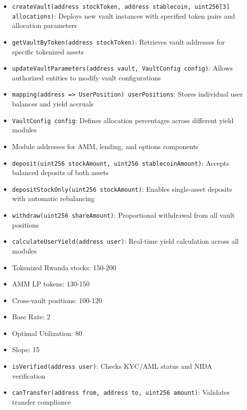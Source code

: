 \documentclass[12pt]{article}
\begin{document}
{{{\begin{itemize}
\subsubsection{3.2 Core Architecture Overview} %
	\item \lstinline{createVault(address stockToken, address stablecoin, uint256[3] allocations)}: Deploys new vault instances with specified token pairs and allocation parameters
	\item \lstinline{getVaultByToken(address stockToken)}: Retrieves vault addresses for specific tokenized assets
	\item \lstinline{updateVaultParameters(address vault, VaultConfig config)}: Allows authorized entities to modify vault configurations
	\item \lstinline{mapping(address => UserPosition) userPositions}: Stores individual user balances and yield accruals
	\item \lstinline{VaultConfig config}: Defines allocation percentages across different yield modules
	\item Module addresses for AMM, lending, and options components
	\item \lstinline{deposit(uint256 stockAmount, uint256 stablecoinAmount)}: Accepts balanced deposits of both assets
	\item \lstinline{depositStockOnly(uint256 stockAmount)}: Enables single-asset deposits with automatic rebalancing
	\item \lstinline{withdraw(uint256 shareAmount)}: Proportional withdrawal from all vault positions
	\item \lstinline{calculateUserYield(address user)}: Real-time yield calculation across all modules
	\item Tokenized Rwanda stocks: 150-200%
	\item AMM LP tokens: 130-150%
	\item Cross-vault positions: 100-120%
	\item Base Rate: 2%
	\item Optimal Utilization: 80%
	\item Slope: 15%
	\item \lstinline{isVerified(address user)}: Checks KYC/AML status and NIDA verification
	\item \lstinline{canTransfer(address from, address to, uint256 amount)}: Validates transfer compliance

\end{itemize}}}}
\end{document}
